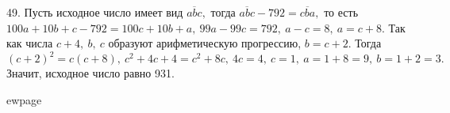 49. Пусть исходное число имеет вид $\overline{abc},$ тогда
$\overline{abc}-792=\overline{cba},$ то есть
$100a+10b+c-792=100c+10b+a,\ 99a-99c=792,\ a-c=8,\ a=c+8.$ Так как числа $c+4,\ b,\ c$ образуют арифметическую прогрессию, $b=c+2.$ Тогда $(c+2)^2=c(c+8),\ c^2+4c+4=c^2+8c,\ 4c=4,\ c=1,\ a=1+8=9,\ b=1+2=3.$ Значит, исходное число равно 931.

ewpage
